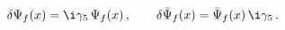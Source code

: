 \begin{equation}
\delta \Psi_f (x)= \i \gamma_5\, \Psi_f(x)\,, \qquad \delta \bar \Psi_f(x) =
 \bar \Psi_f(x)\, \i\gamma_5\,.
\end{equation}

